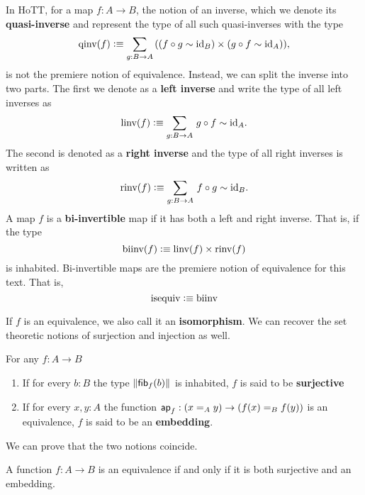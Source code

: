 \documentclass[main.tex]{subfiles}
\begin{document}
In HoTT, for a map $f : A \to B$, the notion of an inverse, which we denote its \textbf{quasi-inverse} and represent the type of all such
quasi-inverses with the type
\begin{equation}
    \qinv(f) \defeq \sm{g : B \to A}((f\circ g \sim \id{B})\times(g \circ f \sim \id{A})),
\end{equation} is not the premiere notion of equivalence. Instead, we can split the inverse into two parts. The first we denote
as a \textbf{left inverse} and write the type of all left inverses as 
\begin{equation}
    \linv(f) \defeq \sm{g : B \to A}g \circ f \sim \id{A}.
\end{equation}
The second is denoted as a \textbf{right inverse} and the type of all right inverses is written as
\begin{equation}
    \rinv(f) \defeq \sm{g : B \to A} f \circ g \sim \id{B}.
\end{equation}
A map $f$ is a \textbf{bi-invertible} map if it has both a left and right inverse. That is, if the type
\begin{equation}
\normalfont \text{biinv}(f) \vcentcolon\equiv \normalfont \text{linv}(f) \times \normalfont \text{rinv}(f)
\end{equation}
is inhabited. Bi-invertible maps are the premiere notion of equivalence for this text. That is,
\begin{equation}
    \normalfont \text{isequiv} \vcentcolon\equiv \normalfont \text{biinv}
\end{equation}

If $f$ is an equivalence, we also call it an \textbf{isomorphism}. We can recover the set theoretic
notions of surjection and injection as well.
\begin{definition}
    For any $f : A \to B$
    \begin{enumerate}
        \item If for every $b:B$ the type $\mathopen{}\left\Vert {\mathsf{fib}}_{f}(b)\right\Vert_{}\mathclose{}$ is inhabited, $f$ is said to be \textbf{surjective}
        \item If for every $x,y : A$ the function $\mathsf{ap}_{f}:(x=_A y) \to (f(x) =_B f(y))$ is an equivalence, $f$ is said to be an
            \textbf{embedding}.
    \end{enumerate}
\end{definition}

We can prove that the two notions coincide.

\begin{lemma}
    \label{lem:equivissurjemb}
    A function $f : A \to B$ is an equivalence if and only if it is both surjective and an embedding.
\end{lemma}
\end{document}
